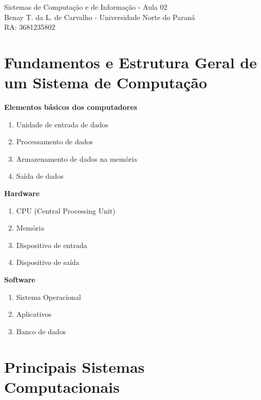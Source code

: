 \documentclass[12pt, a4paper]{article}
\begin{document}
\begin{center}
    
    {\LARGE
        Sistemas de Computação e de Informação - Aula 02\\
    }
    {\Large
        Benay T. da L. de Carvalho - Universidade Norte do Paraná\\
        RA: 3681235802
    }

\end{center}

\vspace*{1cm}

\section{Fundamentos e Estrutura Geral de um Sistema de Computação}
{\Large

\textbf{Elementos básicos dos computadores}

\begin{enumerate}[label=\textbf{\roman*}]
    \item Unidade de entrada de dados
    \item Processamento de dados
    \item Armazenamento de dados na memória
    \item Saída de dados
\end{enumerate}

\textbf{Hardware}

\begin{enumerate}[label=\textbf{\roman*}]
    \item CPU (Central Processing Unit)
    \item Memória
    \item Dispositivo de entrada
    \item Dispositivo de saída
\end{enumerate}

\textbf{Software}

\begin{enumerate}[label=\textbf{\roman*}]
    \item Sistema Operacional
    \item Aplicativos
    \item Banco de dados
\end{enumerate}

}

\newpage
\vspace*{1cm}

\section{Principais Sistemas Computacionais}
\end{document}
